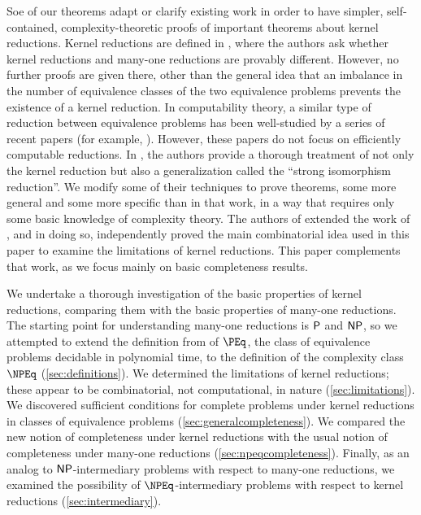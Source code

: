 Soe of our theorems adapt or clarify existing work in order to have simpler, self-contained, complexity-theoretic proofs of important theorems about kernel reductions.
Kernel reductions are defined in \autocite{fg11}, where the authors ask whether kernel reductions and many-one reductions are provably different.
However, no further proofs are given there, other than the general idea that an imbalance in the number of equivalence classes of the two equivalence problems prevents the existence of a kernel reduction.
In computability theory, a similar type of reduction between equivalence problems has been well-studied by a series of recent papers (for example, \autocite{gg01, ff12, ffn12, chm12, imnn13, almnss14, mn14}).
However, these papers do not focus on efficiently computable reductions.
In \autocite{bcffm}, the authors provide a thorough treatment of not only the kernel reduction but also a generalization called the ``strong isomorphism reduction''.
We modify some of their techniques to prove theorems, some more general and some more specific than in that work, in a way that requires only some basic knowledge of complexity theory.
The authors of \autocite{gz14} extended the work of \autocite{bcffm}, and in doing so, independently proved the main combinatorial idea used in this paper to examine the limitations of kernel reductions.
This paper complements that work, as we focus mainly on basic completeness results.

We undertake a thorough investigation of the basic properties of kernel reductions, comparing them with the basic properties of many-one reductions.
The starting point for understanding many-one reductions is $\P$ and $\NP$, so we attempted to extend the definition from \autocite{fg11} of $\PEq$, the class of equivalence problems decidable in polynomial time, to the definition of the complexity class $\NPEq$ (\autoref{sec:definitions}).
We determined the limitations of kernel reductions; these appear to be combinatorial, not computational, in nature (\autoref{sec:limitations}).
We discovered sufficient conditions for complete problems under kernel reductions in classes of equivalence problems (\autoref{sec:generalcompleteness}).
We compared the new notion of completeness under kernel reductions with the usual notion of completeness under many-one reductions (\autoref{sec:npeqcompleteness}).
Finally, as an analog to $\NP$-intermediary problems with respect to many-one reductions, we examined the possibility of $\NPEq$-intermediary problems with respect to kernel reductions (\autoref{sec:intermediary}).
